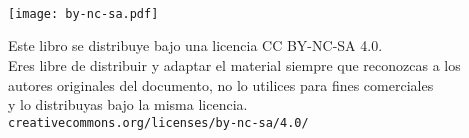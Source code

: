 \documentclass[10pt, a4paper]{article}
\newif\IfInSansMode
\let\oldsf\sffamily
\renewcommand*{\sffamily}{\oldsf\sansmath\InSansModetrue}
\begin{document}

\afterpage{\restorepagecolor} %
\begin{titlepage}

	\parbox[t]{\textwidth}{
			\raggedright %
			\fontsize{50pt}{50pt}\selectfont\sffamily\color{white}{
			  \textbf{\asignatura}
      }
	}

	\vfill

	\parbox[t]{\textwidth}{
		\raggedright %
		\sffamily\large\color{white}
		{\Large \autor }\\[4pt]
		\grado\\
		\universidad\\[4pt]
		\texttt{\enlaceweb}
	}

\end{titlepage}


\thispagestyle{empty}
\null
\vfill

\parbox[t]{\textwidth}{
  \texttt{[image: by-nc-sa.pdf]}\\[4pt]
  \raggedright %
  \sffamily\large
  {\Large Este libro se distribuye bajo una licencia CC BY-NC-SA 4.0.}\\[4pt]
  Eres libre de distribuir y adaptar el material siempre que reconozcas a los\\
  autores originales del documento, no lo utilices para fines comerciales\\
  y lo distribuyas bajo la misma licencia.\\[4pt]
  \texttt{creativecommons.org/licenses/by-nc-sa/4.0/}
}


\begin{titlepage}

	\parbox[t]{\textwidth}{
			\raggedright %
			\fontsize{50pt}{50pt}\selectfont\sffamily\color{500}{
			  \textbf{\asignatura}
      }
	}

	\vfill

	\parbox[t]{\textwidth}{
		\raggedright %
		\sffamily\large
		{\Large \autor}\\[4pt]
		\grado\\
		\universidad\\[4pt]
		\texttt{\enlaceweb}
	}

\end{titlepage}
\end{document}
